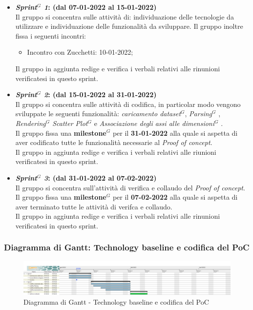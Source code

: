 \begin{itemize}
    \item \textbf{\textit{Sprint$^G$  1}: (dal 07-01-2022 al 15-01-2022)}\\
    Il gruppo si concentra sulle attività di: individuazione delle tecnologie da utilizzare e individuazione delle funzionalità da sviluppare.
    Il gruppo inoltre fissa i seguenti incontri:
    \begin{itemize}
        \item Incontro con Zucchetti: 10-01-2022;
    \end{itemize}
    Il gruppo in aggiunta redige e verifica i verbali relativi alle rinunioni verificatesi in questo sprint.

    \item \textbf{\textit{Sprint$^G$  2}: (dal 15-01-2022 al 31-01-2022)}\\
    Il gruppo si concentra sulle attività di codifica, in particolar modo vengono sviluppate le seguenti funzionalità: \textit{caricamento dataset$^{G}$}, \textit{Parsing}$^G$ , \textit{Rendering$^G$  Scatter Plot$^G$ } e \textit{Associazione degli assi alle dimensioni$^G$ }.\\
    Il gruppo fissa una \textbf{milestone}$^G$  per il \textbf{31-01-2022} alla quale si aspetta di aver codificato tutte le funzionalità necessarie al \textit{Proof of concept}.\\
    Il gruppo in aggiunta redige e verifica i verbali relativi alle riunioni verificatesi in questo sprint.

    \item \textbf{\textit{Sprint$^G$  3}: (dal 31-01-2022 al 07-02-2022)}\\
    Il gruppo si concentra sull'attività di verifica e collaudo del \textit{Proof of concept}.\\
    Il gruppo fissa una \textbf{milestone}$^G$  per il \textbf{07-02-2022} alla quale si aspetta di aver terminato tutte le attività di verifca e collaudo.\\
    Il gruppo in aggiunta redige e verifica i verbali relativi alle rinunioni verificatesi in questo sprint.
\end{itemize}

\subsubsection{Diagramma di Gantt: Technology baseline e codifica del PoC}
\begin{figure}[h!]
    \centering
    \includegraphics[scale=0.22]{../../assets/Diagrammi_Gantt/TB.png}
    \caption{Diagramma di Gantt - Technology baseline e codifica del PoC}
\end{figure}